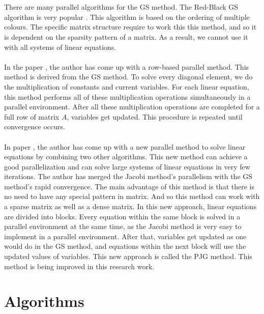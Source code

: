 \documentclass[11pt]{article}       %
\begin{document}
\\
\\
There are many parallel algorithms for the GS method. The Red-Black GS algorithm is very popular \cite{rbgs}. This algorithm is based on the ordering of multiple colours. The specific matrix structure require to work this this method, and so it is dependent on the sparsity pattern of a matrix. As a result, we cannot use it with all systems of linear equations.
\\
\\
In the paper \cite{row-based}, the author has come up with a row-based parallel method. This method is derived from the GS method. To solve every diagonal element, we do the multiplication of constants and current variables. For each linear equation, this method performs all of these multiplication operations simultaneously in a parallel environment. After all these multiplication operations are completed for a full row of matrix $A$, variables get updated. This procedure is repeated until convergence occurs.
\\
\\
In paper \cite{base-paper}, the author has come up with a new parallel method to solve linear equations by combining two other algorithms. This new method can achieve a good parallelization and can solve large systems of linear equations in very few iterations. The author has merged the Jacobi method's parallelism with the GS method's rapid convergence. The main advantage of this method is that there is no need to have any special pattern in matrix. And so this method can work with a sparse matrix as well as a dense matrix. In this new approach, linear equations are divided into blocks. Every equation within the same block is solved in a parallel environment at the same time, as the Jacobi method is very easy to implement in a parallel environment. After that, variables get updated as one would do in the GS method, and equations within the next block will use the updated values of variables. This new approach is called the PJG method. This method is being improved in this research work.

\section{Algorithms} \label{algos}

\end{document}
